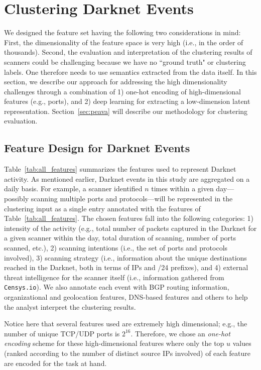 \documentclass[manuscript, nonacm]{acmart}
\begin{document}
\section{Clustering Darknet Events}
\label{sec:clusteringScanners}

We designed the feature set having the following two
considerations in mind:
First, the dimensionality of the feature space  
is very high (i.e., in the order of thousands). 
Second, the evaluation and interpretation
of the clustering results of scanners could be challenging because 
we have no ``ground truth" or clustering labels.
One therefore needs to use semantics extracted from the
data itself.  In this section,
we describe our approach for addressing the high dimensionality challenges through a combination of
1) one-hot encoding of high-dimensional features (e.g., ports), 
and 2) deep learning for extracting a
low-dimension latent representation. Section~\ref{sec:peava} will describe our methodology for
clustering evaluation.

\subsection{Feature Design for Darknet Events}
\label{sec:features}

Table~\ref{tab:all_features} summarizes the features
used to represent Darknet activity. 
As mentioned earlier, Darknet events in this study are aggregated on a daily basis.
For example, a scanner identified $n$ times within a given day---possibly 
scanning multiple ports and protocols---will be represented
in the clustering input as a single entry annotated with the features of Table~\ref{tab:all_features}.
The chosen features fall into the following categories:
1)  intensity of the activity (e.g., total number of packets captured
in the Darknet for a given scanner within the day, total duration of scanning, number
of ports scanned, etc.), 
2) scanning intentions (i.e., the set of ports and protocols involved),
3) scanning strategy (i.e., information about the unique destinations
reached in the Darknet, both in terms of IPs and /24 prefixes),
and 4)
external threat intelligence for the scanner itself (i.e., information gathered from \texttt{Censys.io}).
We also annotate each event with BGP routing information, organizational and geolocation features,
DNS-based features and others to help the analyst interpret the clustering results.

Notice here that several features used are extremely high
dimensional; e.g.,
the number of unique TCP/UDP ports is $2^{16}$. 
Therefore, we chose an \emph{one-hot encoding} scheme for these high-dimensional 
features where only the top $u$ values (ranked according to the number of
distinct source IPs involved) of each feature are
encoded for the task at hand.
\end{document}
